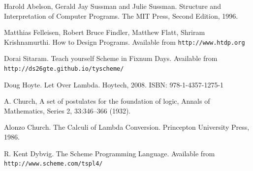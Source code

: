 \documentclass[a4paper,12pt]{book}
\begin{document}

\begin{thebibliography}{99}

 Harold Abelson, Gerald Jay Sussman and
Julie Sussman. Structure and Interpretation of
Computer Programs. The MIT Press, Second Edition, 1996.

 Matthias Felleisen,
Robert Bruce Findler, Matthew Flatt, Shriram Krishnamurthi.
How to Design Programs.
Available from \verb|http://www.htdp.org|

 Dorai Sitaram. Teach yourself Scheme
in Fixnum Days. Available
from \verb|http://ds26gte.github.io/tyscheme/|

 Doug Hoyte. Let Over Lambda. Hoytech, 2008. ISBN: 978-1-4357-1275-1

 A. Church, A set of postulates for the foundation of logic, Annals of Mathematics, Series 2, 33:346–366 (1932).

 Alonzo Church. The Calculi of Lambda Conversion. Princepton University Press, 1986.

 R. Kent Dybvig. The Scheme Programming Language.
Available from \verb|http://www.scheme.com/tspl4/|

\end{thebibliography}

\printindex
\end{document}

